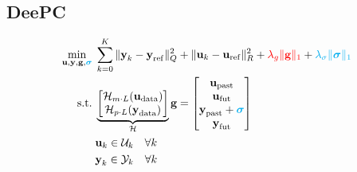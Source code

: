 \subsection{DeePC}
\begin{minipage}{0.53\textwidth}
    \begin{align*}
        \underset{\textbf{u}, \textbf{y}, \textbf{g}, {\color{cyan}\boldsymbol{\sigma}}}{\operatorname{min}} \; & \sum_{k=0}^{K} \|\textbf{y}_k - \textbf{y}_\mathrm{ref} \|^2_Q + \|\textbf{u}_k - \textbf{u}_\mathrm{ref} \|_R^2 + {\color{red}\lambda_g \| \textbf{g} \|_1} + {\color{cyan}\lambda_\sigma \| \boldsymbol{\sigma} \|_1} \\
        \text{s.t.} \; & \underbrace{\begin{bmatrix}
        \mathcal{H}_{m \cdot L}(\textbf{u}_{\text{data}}) \\
        \mathcal{H}_{p \cdot L}(\textbf{y}_{\text{data}})
        \end{bmatrix}}_{\mathcal{H}} \textbf{g} = \begin{bmatrix}
        \textbf{u}_{\text{past}} \\
        \textbf{u}_{\text{fut}} \\
        \textbf{y}_{\text{past}} + {\color{cyan}\boldsymbol{\sigma}}\\
        \textbf{y}_{\text{fut}}
        \end{bmatrix} \\
        & \textbf{u}_k \in \mathcal{U}_k \quad \forall k \\
        & \textbf{y}_k \in \mathcal{Y}_k \quad \forall k \\
    \end{align*}
\end{minipage}
